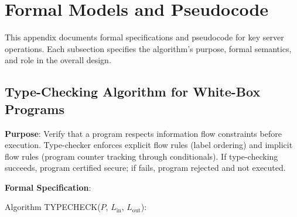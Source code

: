 \appendix

\section{Formal Models and Pseudocode}

This appendix documents formal specifications and pseudocode for key server operations. Each subsection specifies the algorithm's purpose, formal semantics, and role in the overall design.

\subsection{Type-Checking Algorithm for White-Box Programs}

\textbf{Purpose}: Verify that a program respects information flow constraints before execution. Type-checker enforces explicit flow rules (label ordering) and implicit flow rules (program counter tracking through conditionals). If type-checking succeeds, program certified secure; if fails, program rejected and not executed.

\textbf{Formal Specification}:

Algorithm TYPECHECK($P$, $L_{\text{in}}$, $L_{\text{out}}$):

